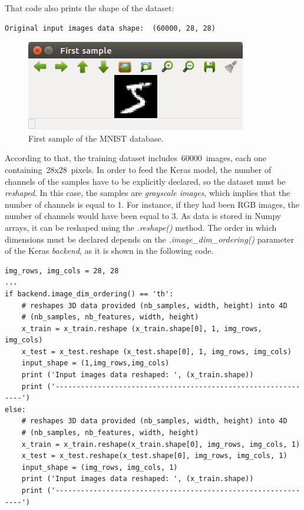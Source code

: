 That code also prints the shape of the dataset:
\begin{Verbatim}[frame=single]
Original input images data shape:  (60000, 28, 28)
\end{Verbatim}

\begin{figure}
	\centering
	\includegraphics[width=0.7\linewidth, keepaspectratio]{figures/first_sample.png}
	\caption{First sample of the MNIST database.}
	\label{fig:firstsample}
\end{figure}

According to that, the training dataset includes~60000~images, each one containing~28x28~pixels. In order to feed the Keras model, the number of channels of the samples have to be explicitly declared, so the dataset must be \emph{reshaped}. In this case, the samples are \emph{grayscale images}, which implies that the number of channels is equal to 1. For instance, if they had been RGB images, the number of channels would have been equal to 3. As data is stored in Numpy arrays, it can be reshaped using the \textit{.reshape()} method. The order in which dimensions must be declared depends on the \textit{.image\_dim\_ordering()} parameter of the Keras \textit{backend}, as it is shown in the following code.
\begin{lstlisting}
img_rows, img_cols = 28, 28
...
if backend.image_dim_ordering() == 'th':
	# reshapes 3D data provided (nb_samples, width, height) into 4D
	# (nb_samples, nb_features, width, height) 
	x_train = x_train.reshape (x_train.shape[0], 1, img_rows, img_cols)
	x_test = x_test.reshape (x_test.shape[0], 1, img_rows, img_cols)
	input_shape = (1,img_rows,img_cols)
	print ('Input images data reshaped: ', (x_train.shape))
	print ('--------------------------------------------------------------')
else:
	# reshapes 3D data provided (nb_samples, width, height) into 4D
	# (nb_samples, nb_features, width, height) 
	x_train = x_train.reshape(x_train.shape[0], img_rows, img_cols, 1)
	x_test = x_test.reshape(x_test.shape[0], img_rows, img_cols, 1)
	input_shape = (img_rows, img_cols, 1)
	print ('Input images data reshaped: ', (x_train.shape))
	print ('--------------------------------------------------------------')
\end{lstlisting}

